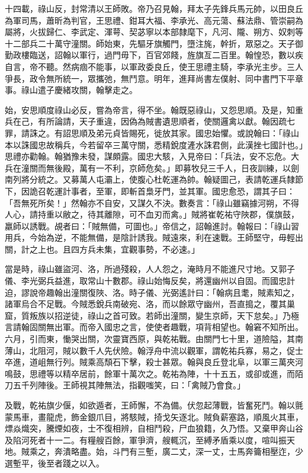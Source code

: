 \begin{pinyinscope}
 十四載，祿山反，封常清以王師敗。帝乃召見翰，拜太子先鋒兵馬元帥，以田良丘為軍司馬，蕭昕為判官，王思禮、鉗耳大福、李承光、高元蕩、蘇法鼎、管崇嗣為屬將，火拔歸仁、李武定、渾萼、契苾寧以本部隸麾下，凡河、隴、朔方、奴刺等十二部兵二十萬守潼關。師始東，先驅牙旗觸門，墮注旄，幹折，眾惡之。天子御勤政樓臨送，詔翰以軍行，過門毋下，百官郊餞，旌旗亙二百里。翰惶恐，數以疾自言，帝不聽。然病痼不能事，以軍政委良丘，使王思禮主騎，李承光主步。三人爭長，政令無所統一，眾攜弛，無鬥意。明年，進拜尚書左僕射、同中書門下平章事。祿山遣子慶緒攻關，翰擊走之。



 始，安思順度祿山必反，嘗為帝言，得不坐。翰既惡祿山，又怨思順。及是，知重兵在己，有所論請，天子重違，因偽為賊書遺思順者，使關邏禽以獻。翰因疏七罪，請誅之。有詔思順及弟元貞皆賜死，徙放其家。國忠始懼。或說翰曰：「祿山本以誅國忠故稱兵，今若留卒三萬守關，悉精銳度滻水誅君側，此漢挫七國計也。」思禮亦勸翰。翰猶豫未發，謀頗露。國忠大駭，入見帝曰：「兵法，安不忘危。大兵在潼關而無後殿，萬有一不利，京師危矣。」即募牧兒三千人，日夜訓練，以劍南列將分統之。又募萬人屯灞上，使腹心杜乾運為帥。翰疑圖己，表請乾運兵隸節下，因詭召乾運計事者，至軍，即斬首梟牙門，並其軍。國忠愈恐，謂其子曰：「吾無死所矣！」然翰亦不自安，又謀久不決。數奏言：「祿山雖竊據河朔，不得人心，請持重以敝之，待其離隙，可不血刃而禽。」賊將崔乾祐守陜郡，僕旗鼓，羸師以誘戰。覘者曰：「賊無備，可圖也。」帝信之，詔翰進討。翰報曰：「祿山習用兵，今始為逆，不能無備，是陰計誘我。賊遠來，利在速戰。王師堅守，毋輕出關，計之上也。且四方兵未集，宜觀事勢，不必速。」



 當是時，祿山雖盜河、洛，所過殘殺，人人怨之，淹時月不能進尺寸地。又郭子儀、李光弼兵益進，取常山十數郡。祿山始悔反矣，將還幽州以自固。而國忠計迫，謬說帝趣翰出潼關復陜、洛。時子儀、光弼遙計曰：「翰病且耄，賊素知之，諸軍烏合不足戰。今賊悉銳兵南破宛、洛，而以餘眾守幽州，吾直搗之，覆其巢窟，質叛族以招逆徒，祿山之首可致。若師出潼關，變生京師，天下怠矣。」乃極言請翰固關無出軍。而帝入國忠之言，使使者趣戰，項背相望也。翰窘不知所出。六月，引而東，慟哭出關，次靈寶西原，與乾祐戰。由關門七十里，道險隘，其南薄山，北阻河，賊以數千人先伏險。翰浮舟中流以觀軍，謂乾祐兵寡，易之，促士卒進，道岨無行列。賊乘高頹石下擊，殺士甚眾。翰與良丘登北阜，以軍三萬夾河鳴鼓，思禮等以精卒居前，餘軍十萬次之。乾祐為陣，十十五五，或卻或進，而陌刀五千列陣後。王師視其陣無法，指觀嗤笑，曰：「禽賊乃會食。」



 及戰，乾祐旗少偃，如欲遁者，王師懈，不為備。伏忽起薄戰，皆奮死鬥。翰以氈蒙馬車，畫龍虎，飾金銀爪目，將駭賊，掎戈矢逐北。賊負薪塞路，順風火其車，熛焱熾突，騰煙如夜，士不復相辨，自相鬥殺，尸血狼籍，久乃悟。又棄甲奔山谷及陷河死者十一二。有糧艘百餘，軍爭濟，艘輒沉，至縛矛盾乘以度，喧叫振天地。賊乘之，奔潰略盡。始，斗門有三塹，廣二丈，深一丈，士馬奔籥相壓迮，少選塹平，後至者踐之以入。




\end{pinyinscope}

